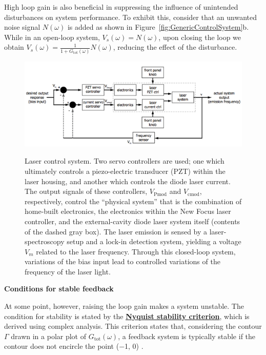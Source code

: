 \documentclass{../lab}
\begin{document}
High loop gain is also beneficial in suppressing the influence of unintended disturbances on system performance. To exhibit this, consider that an unwanted noise signal $N(\omega)$ is added as shown in Figure~\ref{fig:GenericControlSystem}b. While in an open-loop system, $V_s(\omega) = N(\omega)$, upon closing the loop we obtain $V_s(\omega) =\frac{1}{1+G_\text{tot}(\omega)} N(\omega)$, reducing the effect of the disturbance.

\begin{figure}[h]
    \centering
    \href{http://experimentationlab.berkeley.edu/sites/default/files/images/600px-MOTimage002.png}{\includegraphics[width=0.9\linewidth]{images/600px-MOTimage002.png}}
    \caption{Laser control system. Two servo controllers are used; one which ultimately controls a piezo-electric transducer (PZT) within the laser housing, and another which controls the diode laser current. The output signals of these controllers, $V_\text{Pmod}$ and $V_\text{cmod}$, respectively, control the ``physical system'' that is the combination of home-built electronics, the electronics within the New Focus laser controller, and the external-cavity diode laser system itself (contents of the dashed gray box). The laser emission is sensed by a laser-spectroscopy setup and a lock-in detection system, yielding a voltage $V_m$ related to the laser frequency. Through this closed-loop system, variations of the bias input lead to controlled variations of the frequency of the laser light.}
    \label{fig:LaserControlSystem}
\end{figure}

\textbf{Conditions for stable feedback}

At some point, however, raising the loop gain makes a system unstable. The condition for stability is stated by the \href{http://en.wikipedia.org/wiki/Nyquist\_stability\_criterion}{\textbf{Nyquist stability criterion}}, which is derived using complex analysis. This criterion states that, considering the contour $\Gamma$ drawn in a polar plot of $G_\text{tot}(\omega)$, a feedback system is typically stable if the contour does not encircle the point ($-$1, 0) \cite{PreciseCriterion}.
\end{document}

